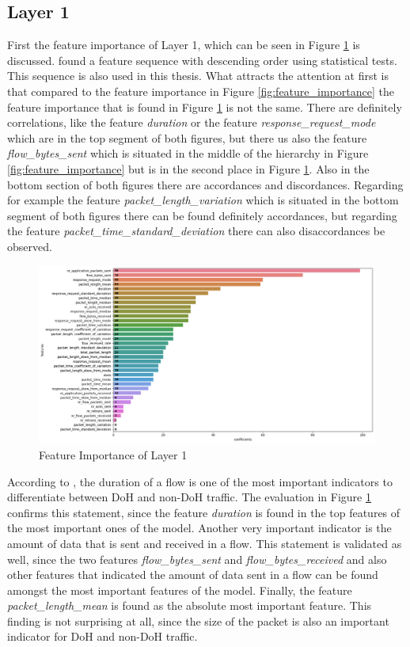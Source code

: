 \subsection{Layer 1}
First the feature importance of Layer 1, which can be seen in Figure \ref{fig:feat_imp_l1} is discussed. \cite{BehnkeEtAl_FeatureEngineeringMLModelMaliciusDoHTraffic} found a feature sequence with descending order using statistical tests. This sequence is also used in this thesis. What attracts the attention at first is that compared to the feature importance in Figure \ref{fig:feature_importance} the feature importance that is found in Figure \ref{fig:feat_imp_l1} is not the same. There are definitely correlations, like the feature \textit{duration} or the feature \textit{response\_request\_mode} which are in the top segment of both figures, but there us also the feature \textit{flow\_bytes\_sent} which is situated in the middle of the hierarchy in Figure \ref{fig:feature_importance} but is in the second place in Figure \ref{fig:feat_imp_l1}. Also in the bottom section of both figures there are accordances and discordances. Regarding for example the feature \textit{packet\_length\_variation} which is situated in the bottom segment of both figures there can be found definitely accordances, but regarding the feature \textit{packet\_time\_standard\_deviation} there can also disaccordances be observed.

\begin{figure} [h]
\includegraphics[scale=0.4]{images/feature_importance_layer_1.png}
\centering
\caption{Feature Importance of Layer 1}
\label{fig:feat_imp_l1}
\end{figure}

According to \cite{VeshkinEtAl_DoHInsightML}, the duration of a flow is one of the most important indicators to differentiate between DoH and non-DoH traffic. The evaluation in Figure \ref{fig:feat_imp_l1} confirms this statement, since the feature \textit{duration} is found in the top features of the most important ones of the model. Another very important indicator is the amount of data that is sent and received in a flow. This statement is validated as well, since the two features \textit{flow\_bytes\_sent} and \textit{flow\_bytes\_received} and also other features that indicated the amount of data sent in a flow can be found amongst the most important features of the model. Finally, the feature \textit{packet\_length\_mean} is found as the absolute most important feature. This finding is not surprising at all, since the size of the packet is also an important indicator for DoH and non-DoH traffic.

